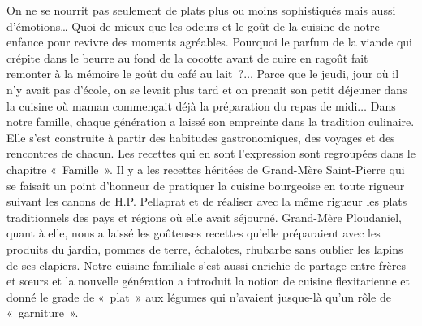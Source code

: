 On ne se nourrit pas seulement de plats plus ou moins sophistiqués mais aussi d'émotions… Quoi de mieux que les odeurs et le goût de la cuisine de notre enfance pour revivre des moments agréables. Pourquoi le parfum de la viande qui crépite dans le beurre au fond de la cocotte avant de cuire en ragoût fait remonter à la mémoire le goût du café au lait ?$\ldots$ Parce que le jeudi, jour où il n’y avait pas d’école, on se levait plus tard et on prenait son petit déjeuner dans la cuisine où maman commençait déjà la préparation du repas de midi$\ldots$
Dans notre famille, chaque génération a laissé son empreinte dans la tradition
culinaire. Elle s’est construite à partir des habitudes gastronomiques, des
voyages et des rencontres de chacun. Les recettes qui en sont l’expression sont
regroupées dans le chapitre « Famille ». Il y a les recettes héritées de
Grand-Mère Saint-Pierre qui se faisait un point d’honneur de pratiquer la
cuisine bourgeoise en toute rigueur suivant les canons de H.P.
Pellaprat \cite{pellaprat} et de réaliser avec la même rigueur les plats traditionnels des pays et régions où elle avait séjourné. Grand-Mère Ploudaniel, quant à elle, nous a laissé les goûteuses recettes qu’elle préparaient avec les produits du jardin, pommes de terre, échalotes, rhubarbe sans oublier les lapins de ses clapiers. Notre cuisine familiale s’est aussi enrichie de partage entre frères et sœurs et la nouvelle génération a introduit la notion de cuisine flexitarienne et donné le grade de « plat » aux légumes qui n’avaient jusque-là qu’un rôle de « garniture ».
